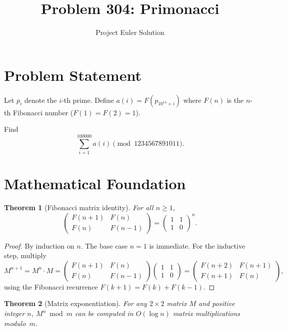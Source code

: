 \documentclass[12pt]{article}
\title{Problem 304: Primonacci}
\author{Project Euler Solution}
\date{}
\newtheorem{theorem}{Theorem}
\begin{document}
\maketitle

\section{Problem Statement}
Let $p_i$ denote the $i$-th prime. Define $a(i) = F(p_{10^{14}+i})$ where $F(n)$ is the $n$-th Fibonacci number ($F(1) = F(2) = 1$).

Find
\[
\sum_{i=1}^{100000} a(i) \pmod{1234567891011}.
\]

\section{Mathematical Foundation}

\begin{theorem}[Fibonacci matrix identity]\label{thm:fib-matrix}
For all $n \ge 1$,
\[
\begin{pmatrix} F(n+1) & F(n) \\ F(n) & F(n-1) \end{pmatrix}
= \begin{pmatrix} 1 & 1 \\ 1 & 0 \end{pmatrix}^{\!n}.
\]
\end{theorem}

\begin{proof}
By induction on $n$. The base case $n=1$ is immediate. For the inductive step, multiply
\[
M^{n+1} = M^n \cdot M
= \begin{pmatrix} F(n+1) & F(n) \\ F(n) & F(n-1) \end{pmatrix}
\begin{pmatrix} 1 & 1 \\ 1 & 0 \end{pmatrix}
= \begin{pmatrix} F(n+2) & F(n+1) \\ F(n+1) & F(n) \end{pmatrix},
\]
using the Fibonacci recurrence $F(k+1) = F(k) + F(k-1)$.
\end{proof}

\begin{theorem}[Matrix exponentiation]\label{thm:fast-exp}
For any $2 \times 2$ matrix $M$ and positive integer $n$, $M^n \bmod m$ can be computed in $O(\log n)$ matrix multiplications modulo~$m$.
\end{theorem}
\end{document}
